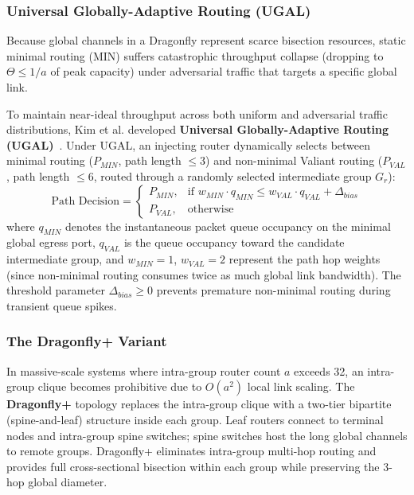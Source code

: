 \subsubsection{Universal Globally-Adaptive Routing (UGAL)}
Because global channels in a Dragonfly represent scarce bisection resources, static minimal routing (MIN) suffers catastrophic throughput collapse (dropping to $\Theta \le 1/a$ of peak capacity) under adversarial traffic that targets a specific global link.

To maintain near-ideal throughput across both uniform and adversarial traffic distributions, Kim et al. developed \textbf{Universal Globally-Adaptive Routing (UGAL)}~\cite{Kim2008}. Under UGAL, an injecting router dynamically selects between minimal routing ($P_{MIN}$, path length $\le 3$) and non-minimal Valiant routing ($P_{VAL}$, path length $\le 6$, routed through a randomly selected intermediate group $G_r$):
\begin{equation}
\text{Path Decision} = 
\begin{cases}
P_{MIN}, & \text{if } w_{MIN} \cdot q_{MIN} \le w_{VAL} \cdot q_{VAL} + \Delta_{bias} \\
P_{VAL}, & \text{otherwise}
\end{cases}
\label{eq:ch4_ugal_cost}
\end{equation}
where $q_{MIN}$ denotes the instantaneous packet queue occupancy on the minimal global egress port, $q_{VAL}$ is the queue occupancy toward the candidate intermediate group, and $w_{MIN} = 1$, $w_{VAL} = 2$ represent the path hop weights (since non-minimal routing consumes twice as much global link bandwidth). The threshold parameter $\Delta_{bias} \ge 0$ prevents premature non-minimal routing during transient queue spikes.

\subsubsection{The Dragonfly+ Variant}
In massive-scale systems where intra-group router count $a$ exceeds 32, an intra-group clique becomes prohibitive due to $O(a^2)$ local link scaling. The \textbf{Dragonfly+} topology replaces the intra-group clique with a two-tier bipartite (spine-and-leaf) structure inside each group. Leaf routers connect to terminal nodes and intra-group spine switches; spine switches host the long global channels to remote groups. Dragonfly+ eliminates intra-group multi-hop routing and provides full cross-sectional bisection within each group while preserving the 3-hop global diameter.

